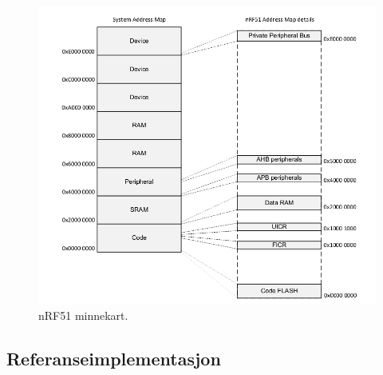 \documentclass[11pt,a4paper]{article}
\begin{document}
\begin{figure}
\centering
\includegraphics[width=\linewidth]{nRF51memorymap.png}
\caption{nRF51 minnekart.}
\label{fig::nrf51::memorymap}
\end{figure}
\subsection{Referanseimplementasjon}
\inputminted{c}{../build/gpio/main.c}
\end{document}
